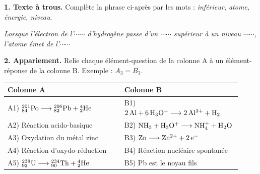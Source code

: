\documentclass[11pt]{article}
\begin{document}



\noindent\textbf{1. Texte à trous.} Complète la phrase ci-après par les mots : \textit{inférieur, atome, énergie, niveau}.

\textit{Lorsque l'électron de l'$\cdots\cdots$ d'hydrogène passe d'un $\cdots\cdots$ supérieur à un niveau $\cdots\cdots$, l'atome émet de l'$\cdots\cdots$}

\medskip
\noindent\textbf{2. Appariement.} Relie chaque élément-question de la colonne A à un élément-réponse de la colonne B. Exemple : $A_3 = B_3$.

\begin{center}\renewcommand{\arraystretch}{1.5}
\begin{tabular}{|p{0.46\linewidth}|p{0.46\linewidth}|}
\hline
\textbf{Colonne A} & \textbf{Colonne B} \\
\hline
A1) $\mathrm{^{201}_{84}Po \longrightarrow {}^{206}_{82}Pb + {}^{4}_{2}He}$ & B1) $\mathrm{2\,Al + 6\,H_3O^+ \longrightarrow 2\,Al^{3+} + H_2}$ \\
\hline
A2) Réaction acido-basique & B2) $\mathrm{NH_3 + H_3O^+ \longrightarrow NH_4^+ + H_2O}$ \\
\hline
A3) Oxydation du métal zinc & B3) $\mathrm{Zn \longrightarrow Zn^{2+} + 2\,e^-}$ \\
\hline
A4) Réaction d'oxydo-réduction & B4) Réaction nucléaire spontanée \\
\hline
A5) $\mathrm{^{238}_{92}U \longrightarrow {}^{234}_{90}Th + {}^{4}_{2}He}$ & B5) Pb est le noyau fils \\
\hline
\end{tabular}
\end{center}
\end{document}

